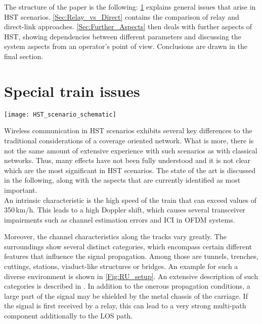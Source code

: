 \documentclass[a4paper,conference,twocolumn,10pt]{IEEEtran}
\begin{document}
The structure of the paper is the following: \cref{Sec:Train_Issues} explains general issues that arise in \ac{HST} scenarios. \cref{Sec:Relay_vs_Direct} contains the comparison of relay and direct-link approaches. \cref{Sec:Further_Aspects} then deals with further aspects of \ac{HST}, showing dependencies between different parameters and discussing the system aspects from an operator's point of view. Conclusions are drawn in the final section.
\section{Special train issues}
\label{Sec:Train_Issues}

\begin{figure*}
	\centering
\texttt{[image: HST\_scenario\_schematic]}
	\caption{Various environments along railroad track. The track is supplied by \acp{RU} that are used by multiple network operators.}
	\label{Fig:RU_setup}
\end{figure*}

Wireless communication in \ac{HST} scenarios exhibits several key differences to the traditional considerations of a coverage oriented network. What is more, there is not the same amount of extensive experience with such scenarios as with classical networks. Thus, many effects have not been fully understood and it is not clear which are the most significant in \ac{HST} scenarios. The state of the art is discussed in the following, along with the aspects that are currently identified as most important.\\

An intrinsic characteristic is the high speed of the train that can exceed values of 350\,km/h. This leads to a high Doppler shift, which causes several transceiver impairments such as channel estimation errors and \ac{ICI} in \ac{OFDM} systems.

Moreover, the channel characteristics along the tracks vary greatly. The surroundings show several distinct categories, which encompass certain different features that influence the signal propagation. Among those are tunnels, trenches, cuttings, stations, viaduct-like structures or bridges. An example for such a diverse environment is shown in \cref{Fig:RU_setup}. An extensive description of such categories is described in \cite{aichallenges}. In addition to the onerous propagation conditions, a large part of the signal may be shielded by the metal chassis of the carriage. If the signal is first received by a relay, this can lead to a very strong multi-path component additionally to the \ac{LOS} path.
\end{document}
